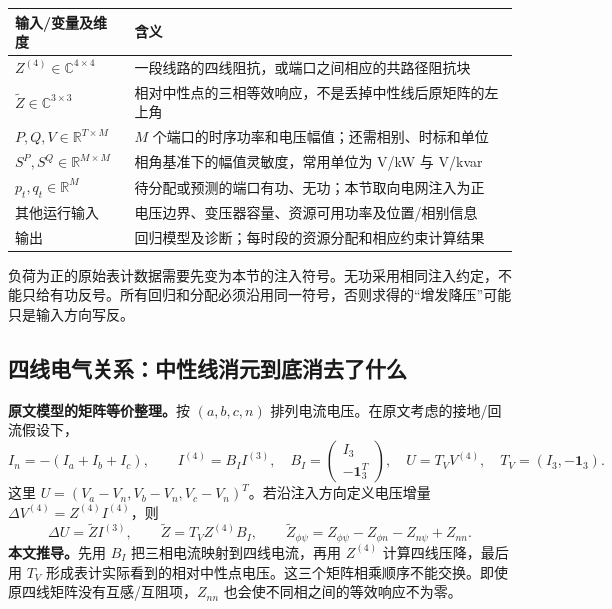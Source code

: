 \documentclass[UTF8,11pt,fontset=fandol,openany,oneside]{ctexbook}
\newcommand{\R}{\mathbb{R}}
\theoremstyle{definition}
\theoremstyle{remark}
\numberwithin{equation}{chapter}
\begin{document}
\begin{center}
\begin{tabularx}{\textwidth}{@{}lX@{}}
\toprule
输入/变量及维度 & 含义 \\
\midrule
$Z^{(4)}\in\mathbb C^{4\times4}$ & 一段线路的四线阻抗，或端口之间相应的共路径阻抗块 \\
$\widetilde Z\in\mathbb C^{3\times3}$ & 相对中性点的三相等效响应，不是丢掉中性线后原矩阵的左上角 \\
$P,Q,V\in\R^{T\times M}$ & $M$ 个端口的时序功率和电压幅值；还需相别、时标和单位 \\
$S^P,S^Q\in\R^{M\times M}$ & 相角基准下的幅值灵敏度，常用单位为 V/kW 与 V/kvar \\
$p_t,q_t\in\R^M$ & 待分配或预测的端口有功、无功；本节取向电网注入为正 \\
其他运行输入 & 电压边界、变压器容量、资源可用功率及位置/相别信息 \\
输出 & 回归模型及诊断；每时段的资源分配和相应约束计算结果 \\
\bottomrule
\end{tabularx}
\end{center}

负荷为正的原始表计数据需要先变为本节的注入符号。无功采用相同注入约定，不能只给有功反号。所有回归和分配必须沿用同一符号，否则求得的“增发降压”可能只是输入方向写反。

\subsection{四线电气关系：中性线消元到底消去了什么}

\textbf{原文模型的矩阵等价整理。}按 $(a,b,c,n)$ 排列电流电压。在原文考虑的接地/回流假设下，
\begin{equation}
 I_n=-(I_a+I_b+I_c),\qquad
 I^{(4)}=B_I I^{(3)},\quad
 B_I=\begin{pmatrix}I_3\\-\boldsymbol1_3^T\end{pmatrix},\quad
 U=T_VV^{(4)},\quad T_V=(I_3,-\boldsymbol1_3).
 \label{eq:oe_s10_neutral}
\end{equation}
这里 $U=(V_a-V_n,V_b-V_n,V_c-V_n)^T$。若沿注入方向定义电压增量
$\Delta V^{(4)}=Z^{(4)}I^{(4)}$，则
\begin{equation}
 \Delta U=\widetilde ZI^{(3)},\qquad
 \widetilde Z=T_VZ^{(4)}B_I,\qquad
 \widetilde Z_{\phi\psi}=Z_{\phi\psi}-Z_{\phi n}-Z_{n\psi}+Z_{nn}.
 \label{eq:oe_s10_fourwire}
\end{equation}
\textbf{本文推导。}先用 $B_I$ 把三相电流映射到四线电流，再用 $Z^{(4)}$ 计算四线压降，最后用 $T_V$ 形成表计实际看到的相对中性点电压。这三个矩阵相乘顺序不能交换。即使原四线矩阵没有互感/互阻项，$Z_{nn}$ 也会使不同相之间的等效响应不为零。
\end{document}
